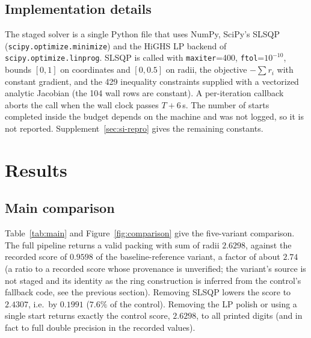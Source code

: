 \documentclass{article} %
\begin{document}
\subsection{Implementation details}\label{sec:impl}
The staged solver is a single Python file that uses NumPy, SciPy's SLSQP (\texttt{scipy.optimize.minimize}) and the HiGHS LP backend of \texttt{scipy.optimize.linprog}. SLSQP is called with \texttt{maxiter}=400, \texttt{ftol}=$10^{-10}$, bounds $[0,1]$ on coordinates and $[0,0.5]$ on radii, the objective $-\sum r_i$ with constant gradient, and the 429 inequality constraints supplied with a vectorized analytic Jacobian (the 104 wall rows are constant). A per-iteration callback aborts the call when the wall clock passes $T+6$\,s. The number of starts completed inside the budget depends on the machine and was not logged, so it is not reported. Supplement~\ref{sec:si-repro} gives the remaining constants.

\section{Results}
\subsection{Main comparison}
Table~\ref{tab:main} and Figure~\ref{fig:comparison} give the five-variant comparison. The full pipeline returns a valid packing with sum of radii $2.6298$, against the recorded score of $0.9598$ of the baseline-reference variant, a factor of about $2.74$ (a ratio to a recorded score whose provenance is unverified; the variant's source is not staged and its identity as the ring construction is inferred from the control's fallback code, see the previous section). Removing SLSQP lowers the score to $2.4307$, i.e.\ by $0.1991$ ($7.6\%$ of the control). Removing the LP polish or using a single start returns exactly the control score, $2.6298$, to all printed digits (and in fact to full double precision in the recorded values).
\end{document}
